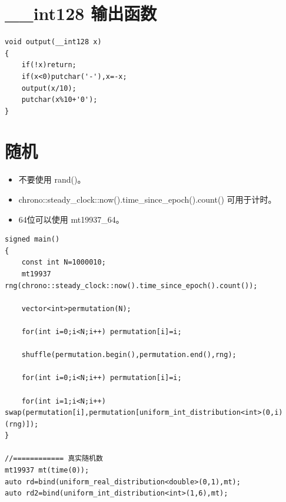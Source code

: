 \section{\_\_int128 输出函数}
\begin{verbatim}
void output(__int128 x)
{
    if(!x)return;
    if(x<0)putchar('-'),x=-x;
    output(x/10);
    putchar(x%10+'0');
}
\end{verbatim}

\section{随机}
\begin{itemize}
\item 不要使⽤ rand()。

\item chrono::steady\_clock::now().time\_since\_epoch().count() 可⽤于计时。

\item 64位可以使⽤ mt19937\_64。
\end{itemize}
\begin{verbatim}
signed main()
{
    const int N=1000010;
    mt19937 rng(chrono::steady_clock::now().time_since_epoch().count());
    
    vector<int>permutation(N);
    
    for(int i=0;i<N;i++) permutation[i]=i;
    
    shuffle(permutation.begin(),permutation.end(),rng);
    
    for(int i=0;i<N;i++) permutation[i]=i;
    
    for(int i=1;i<N;i++) swap(permutation[i],permutation[uniform_int_distribution<int>(0,i)(rng)]);
}

//============ 真实随机数
mt19937 mt(time(0));
auto rd=bind(uniform_real_distribution<double>(0,1),mt);
auto rd2=bind(uniform_int_distribution<int>(1,6),mt);
\end{verbatim}